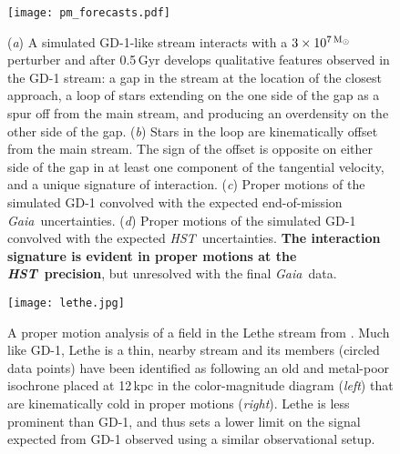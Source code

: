 \documentclass[12pt]{article}
\newcommand{\hst}{\textsl{HST}}
\newcommand{\gaia}{\textsl{Gaia}}
\begin{document}
\begin{figure}
\begin{center}
\texttt{[image: pm\_forecasts.pdf]}
\end{center}
\caption{
(\emph{a}) A simulated GD-1-like stream interacts with a $3\times10^{7\,\rm M_\odot}$ perturber and after 0.5\,Gyr develops qualitative features observed in the GD-1 stream: a gap in the stream at the location of the closest approach, a loop of stars extending on the one side of the gap as a spur off from the main stream, and producing an overdensity on the other side of the gap.
(\emph{b}) Stars in the loop are kinematically offset from the main stream.
The sign of the offset is opposite on either side of the gap in at least one component of the tangential velocity, and a unique signature of interaction.
(\emph{c}) Proper motions of the simulated GD-1 convolved with the expected end-of-mission \gaia\ uncertainties.
(\emph{d}) Proper motions of the simulated GD-1 convolved with the expected \hst\ uncertainties.
{\bf The interaction signature is evident in proper motions at the \hst\ precision}, but unresolved with the final \gaia\ data.
}
\label{fig:fiducial}
\end{figure}

\begin{figure}
\begin{center}
\texttt{[image: lethe.jpg]}
\end{center}
\caption{
A proper motion analysis of a field in the Lethe stream from \textcite{sohn2016}.
Much like GD-1, Lethe is a thin, nearby stream and its members (circled data points) have been identified as following an old and metal-poor isochrone placed at 12\,kpc in the color-magnitude diagram (\emph{left}) that are kinematically cold in proper motions (\emph{right}).
Lethe is less prominent than GD-1, and thus sets a lower limit on the signal expected from GD-1 observed using a similar observational setup.
}
\label{fig:lethe}
\end{figure}
\end{document}

